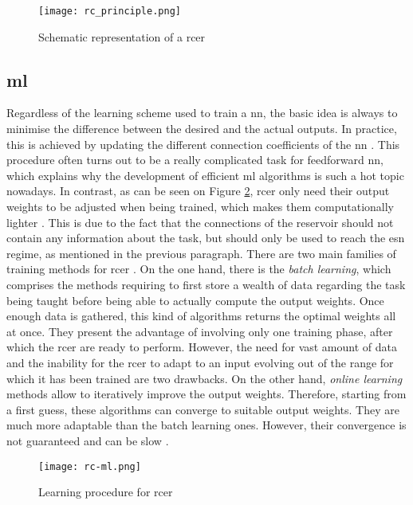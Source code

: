 \begin{figure}[h]
	\centering
	\texttt{[image: rc\_principle.png]}
	\caption{Schematic representation of a \acrlong{rcer} \cite{financialTimeSeries}}
	\label{rc_principle}
\end{figure}


\subsection{\acrlong{ml}}

Regardless of the learning scheme used to train a \gls{nn}, the basic idea is always to minimise the difference between the desired and the actual outputs. In practice, this is achieved by updating the different connection coefficients of the \gls{nn} \cite[p.233]{bishop2006pattern}\cite[p.733]{russell2010artificial}. This procedure often turns out to be a really complicated task for feedforward \gls{nn}, which explains why the development of efficient \gls{ml} algorithms is such a hot topic nowadays. In contrast, as can be seen on Figure \ref{rc-ml}, \gls{rcer} only need their output weights to be adjusted when being trained, which makes them computationally lighter \cite{Jaeger2004}. This is due to the fact that the connections of the reservoir should not contain any information about the task, but should only be used to reach the \gls{esn} regime, as mentioned in the previous paragraph. There are two main families of training methods for \gls{rcer} \cite{Jaeger2002}. On the one hand, there is the \textit{batch learning}, which comprises the methods requiring to first store a wealth of data regarding the task being taught before being able to actually compute the output weights. Once enough data is gathered, this kind of algorithms returns the optimal weights all at once. They present the advantage of involving only one training phase, after which the \gls{rcer} are ready to perform. However, the need for vast amount of data and the inability for the \gls{rcer} to adapt to an input evolving out of the range for which it has been trained are two drawbacks. On the other hand, \textit{online learning} methods allow to iteratively improve the output weights. Therefore, starting from a first guess, these algorithms can converge to suitable output weights. They are much more adaptable than the batch learning ones. However, their convergence is not guaranteed and can be slow \cite{JaegerTraining, schrauwen}.

\begin{figure}[h]
	\centering
	\texttt{[image: rc-ml.png]}
	\caption{Learning procedure for \acrlong{rcer} \cite{Goudarzi2014ACS}}
	\label{rc-ml}
\end{figure}


